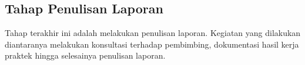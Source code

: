 \subsection{Tahap Penulisan Laporan}
Tahap terakhir ini adalah melakukan penulisan laporan. Kegiatan yang dilakukan diantaranya melakukan konsultasi terhadap pembimbing, dokumentasi hasil kerja praktek hingga selesainya penulisan laporan.
